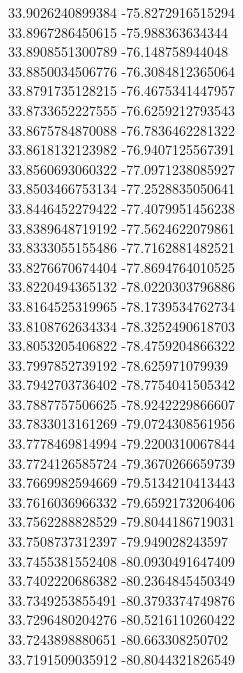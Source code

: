 {33.9026240899384	-75.8272916515294\\
33.8967286450615	-75.988363634344\\
33.8908551300789	-76.148758944048\\
33.8850034506776	-76.3084812365064\\
33.8791735128215	-76.4675341447957\\
33.8733652227555	-76.6259212793543\\
33.8675784870088	-76.7836462281322\\
33.8618132123982	-76.9407125567391\\
33.8560693060322	-77.0971238085927\\
33.8503466753134	-77.2528835050641\\
33.8446452279422	-77.4079951456238\\
33.8389648719192	-77.5624622079861\\
33.8333055155486	-77.7162881482521\\
33.8276670674404	-77.8694764010525\\
33.8220494365132	-78.0220303796886\\
33.8164525319965	-78.1739534762734\\
33.8108762634334	-78.3252490618703\\
33.8053205406822	-78.4759204866322\\
33.7997852739192	-78.625971079939\\
33.7942703736402	-78.7754041505342\\
33.7887757506625	-78.9242229866607\\
33.7833013161269	-79.0724308561956\\
33.7778469814994	-79.2200310067844\\
33.7724126585724	-79.3670266659739\\
33.7669982594669	-79.5134210413443\\
33.7616036966332	-79.6592173206406\\
33.7562288828529	-79.8044186719031\\
33.7508737312397	-79.949028243597\\
33.7455381552408	-80.0930491647409\\
33.7402220686382	-80.2364845450349\\
33.7349253855491	-80.3793374749876\\
33.7296480204276	-80.5216110260422\\
33.7243898880651	-80.663308250702\\
33.7191509035912	-80.8044321826549\\
}
